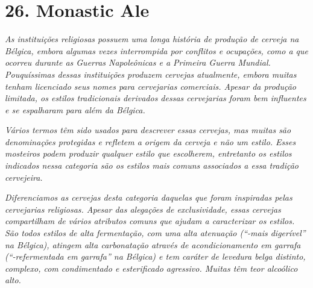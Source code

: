 \section*{26. Monastic Ale}
\textit{As instituições religiosas possuem uma longa história de produção de cerveja na Bélgica, embora algumas vezes interrompida por conflitos e ocupações, como a que ocorreu durante as Guerras Napoleônicas e a Primeira Guerra Mundial. Pouquíssimas dessas instituições produzem cervejas atualmente, embora muitas tenham licenciado seus nomes para cervejarias comerciais. Apesar da produção limitada, os estilos tradicionais derivados dessas cervejarias foram bem influentes e se espalharam para além da Bélgica.}

\textit{Vários termos têm sido usados para descrever essas cervejas, mas muitas são denominações protegidas e refletem a origem da cerveja e não um estilo. Esses mosteiros podem produzir qualquer estilo que escolherem, entretanto os estilos indicados nessa categoria são os estilos mais comuns associados a essa tradição cervejeira.}

\textit{Diferenciamos as cervejas desta categoria daquelas que foram inspiradas pelas cervejarias religiosas. Apesar das alegações de exclusividade, essas cervejas compartilham de vários atributos comuns que ajudam a caracterizar os estilos. São todos estilos de alta fermentação, com uma alta atenuação (“-mais digerível” na Bélgica), atingem alta carbonatação através de acondicionamento em garrafa (“-refermentada em garrafa” na Bélgica) e tem caráter de levedura belga distinto, complexo, com condimentado e esterificado agressivo. Muitas têm teor alcoólico alto.}
